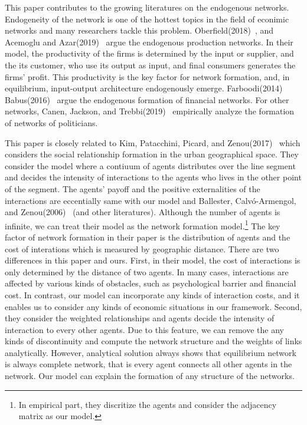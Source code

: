 \documentclass[12pt]{article}
\theoremstyle{definition}
\begin{document}
This paper contributes to the growing literatures on the endogenous networks.
Endogeneity of the network is one of the hottest topics in the field of econimic networks and many researchers tackle this problem.
Oberfield(2018)~\cite{ober}, and Acemoglu and Azar(2019)~\cite{endo_net} argue the endogenous production networks.
In their model, the productivity of the firms is determined by the input or supplier, and the its customer, who use its output as input, and final consumers generates the firms' profit.
This productivity is the key factor for network formation, and, in equilibrium, input-output architecture endogenously emerge.
Farboodi(2014)~\cite{farboodi} Babus(2016)~\cite{babus} argue the endogenous formation of financial networks.
For other networks, Canen, Jackson, and Trebbi(2019)~\cite{canen} empirically analyze the formation of networks of politicians.

This paper is closely related to Kim, Patacchini, Picard, and Zenou(2017)~\cite{Urban} which considers the social relationship formation in the urban geographical space.
They consider the model where a contiuum of agents distributes over the line segment and decides the intensity of interactions to the agents who lives in the other point of the segment.
The agents' payoff and the positive externalities of the interactions are eccentially same with our model and Ballester, Calv\'{o}-Armengol, and Zenou(2006)~\cite{whowho} (and other literatures).
Although the number of agents is infinite, we can treat their model as the network formation model.\footnote{In empirical part, they discritize the agents and consider the adjacency matrix as our model.}
The key factor of network formation in their paper is the distribution of agents and the cost of interations which is measured by geographic distance.
There are two differences in this paper and ours.
First, in their model, the cost of interactions is only determined by the distance of two agents.
In many cases, interactions are affected by various kinds of obstacles, such as psychological barrier and financial cost.
In contrast, our model can incorporate any kinds of interaction costs, and it enables us to consider any kinds of economic situations in our framework.
Second, they consider the weighted relationships and agents decide the intensity of interaction to every other agents.
Due to this feature, we can remove the any kinds of discontinuity and compute the network structure and the weights of links analytically.
However, analytical solution always shows that equilibrium network is always complete network, that is every agent connects all other agents in the network.
Our model can explain the formation of any structure of the networks.
\end{document}
